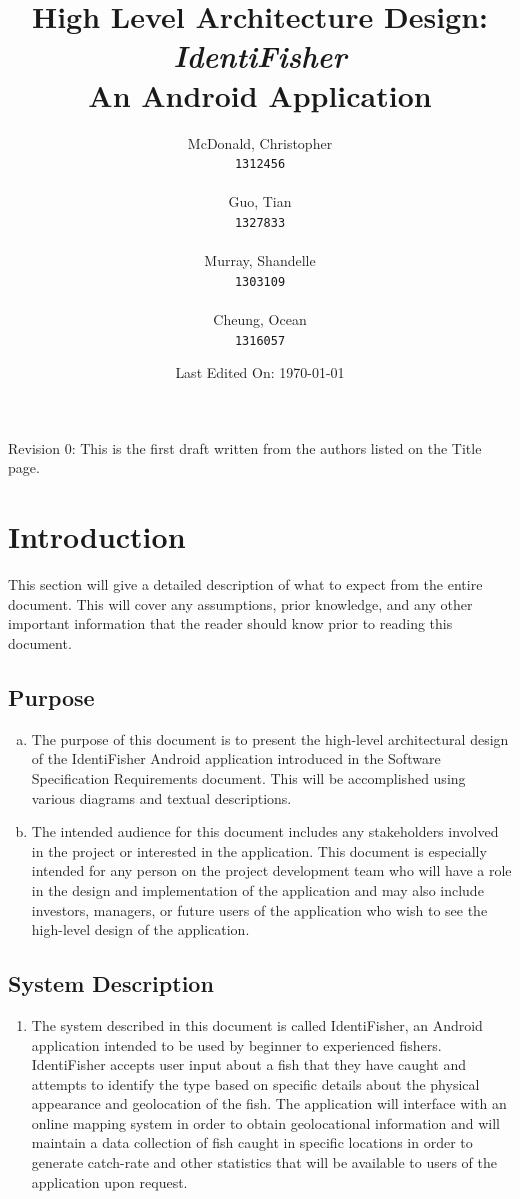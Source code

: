 \documentclass[]{article}
\title{High Level Architecture Design: \\ \textit{IdentiFisher} \\ An Android Application \\}
\author{
\Large McDonald, Christopher\\
\texttt{1312456} \\ \\
\Large Guo, Tian\\
\texttt{1327833} \\ \\
\Large Murray, Shandelle\\
\texttt{1303109} \\ \\
\Large Cheung, Ocean\\
\texttt{1316057} \\
}
\date{Last Edited On: \today}
\begin{document}
\maketitle

\newpage
\tableofcontents
\vfill
Revision 0: This is the first draft written from the authors listed on the Title page.
\pagebreak

\section{Introduction}
\label{sec:introduction}
This section will give a detailed description of what to expect from the entire document. This will cover any assumptions, prior knowledge, and any other important information that the reader should know prior to reading this document.

\subsection{Purpose}
\label{sub:purpose}
\begin{enumerate}[a)]
	\item
	The purpose of this document is to present the high-level architectural design of the IdentiFisher Android application introduced in the Software Specification Requirements document. This will be accomplished using various diagrams and textual descriptions.
	\item
	The intended audience for this document includes any stakeholders involved in the project or interested in the application. This document is especially intended for any person on the project development team who will have a role in the design and implementation of the application and may also include investors, managers, or future users of the application who wish to see the high-level design of the application.
\end{enumerate}

\subsection{System Description}
\label{sub:system_description}
\begin{enumerate}[]
	\item
	The system described in this document is called IdentiFisher, an Android application intended to be used by beginner to experienced fishers. IdentiFisher accepts user input about a fish that they have caught and attempts to identify the type based on specific details about the physical appearance and geolocation of the fish. The application will interface with an online mapping system in order to obtain geolocational information and will maintain a data collection of fish caught in specific locations in order to generate catch-rate and other statistics that will be available to users of the application upon request.
\end{enumerate}
\end{document}
